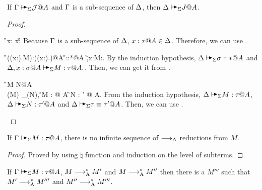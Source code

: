 
\begin{lemma}
    \label{lemma:AlgorithmicWeakening}
    If \(\G \AVS \mathcal{J}@A\) and \(\Gamma\) is a sub-sequence of \(\Delta\), then \(\D \AVS J@A\).
\end{lemma}

\begin{proof}
    \begin{rneqncase}{\TAVar}{
        \G \AVS x:\tau@A
        x:\tau@A \in \G
        }
        Because \( \Gamma \) is a sub-sequence of \( \Delta \), \( x:\tau@A \in \D \).
        Therefore, we can use \TAVar.
    \end{rneqncase}
    \begin{rneqncase}{\TAAbs}{
            \G\AVS(\lambda (x:\sigma).M):(\Pi (x:\sigma).\tau)@A
            \G\AVS \sigma::*@A 
            \G,x:\sigma@A\AVS M:\tau@A.
        }
        By the induction hypothesis, \( \D \AVS \sigma::*@A \) and \(
        \D,x:\sigma@A\AVS M:\tau@A. \). Then, we can get it from \TAAbs.
    \end{rneqncase}
    \begin{rneqncase}{\QAANF}{
            \G \AVS M \E N@A
             \\
            \ANF(M) \E_\alpha \ANF(N),
            \G \AVS M : \tau @ A 
            \G \AVS N : \tau' @ A.
        }
        From the induction hypothesis, \( \D \AVS M : \tau @ A \), \( \D \AVS N
        : \tau' @ A \) and \( \D \AVS \tau \E \tau' @ A \). Then, we can use \QAANF.
    \end{rneqncase}
\end{proof}

\begin{lemma}
    \label{lemma:StrongNormalizationofAlgorithmicReduction}
    If \( \G \AVS M :\tau @ A\), there is no infinite sequence of \( \longrightarrow_{\text{A}} \) reductions from \( M \).
\end{lemma}

\begin{proof}
    Proved by using \( \natural \) function and induction on the level of subterms.
\end{proof}

\begin{lemma}
    \label{lemma:ConfluenceofAlgorithmicReduction}
    If \( \G \AVS M :\tau @ A\), \( M \longrightarrow_{\text{A}}^* M' \) and \(M \longrightarrow_{\text{A}}^* M''\)
    then there is a \( M''' \) such that \( M' \longrightarrow_{\text{A}}^* M''' \) and \( M'' \longrightarrow_{\text{A}}^* M''' \).
\end{lemma}

